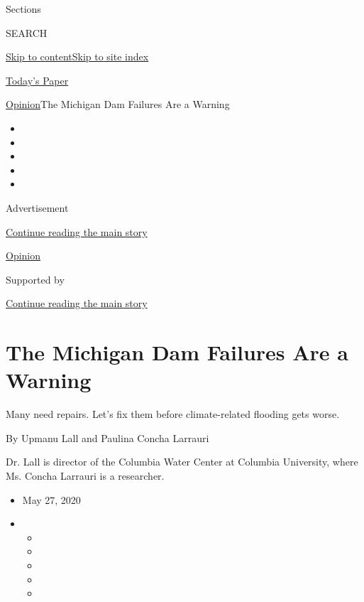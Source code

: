 Sections

SEARCH

\protect\hyperlink{site-content}{Skip to
content}\protect\hyperlink{site-index}{Skip to site index}

\href{https://myaccount.nytimes.com/auth/login?response_type=cookie\&client_id=vi}{}

\href{https://www.nytimes.com/section/todayspaper}{Today's Paper}

\href{/section/opinion}{Opinion}\textbar{}The Michigan Dam Failures Are
a Warning

\begin{itemize}
\item
\item
\item
\item
\item
\end{itemize}

Advertisement

\protect\hyperlink{after-top}{Continue reading the main story}

\href{/section/opinion}{Opinion}

Supported by

\protect\hyperlink{after-sponsor}{Continue reading the main story}

\hypertarget{the-michigan-dam-failures-are-a-warning}{%
\section{The Michigan Dam Failures Are a
Warning}\label{the-michigan-dam-failures-are-a-warning}}

Many need repairs. Let's fix them before climate-related flooding gets
worse.

By Upmanu Lall and Paulina Concha Larrauri

Dr. Lall is director of the Columbia Water Center at Columbia
University, where Ms. Concha Larrauri is a researcher.

\begin{itemize}
\item
  May 27, 2020
\item
  \begin{itemize}
  \item
  \item
  \item
  \item
  \item
  \end{itemize}
\end{itemize}

